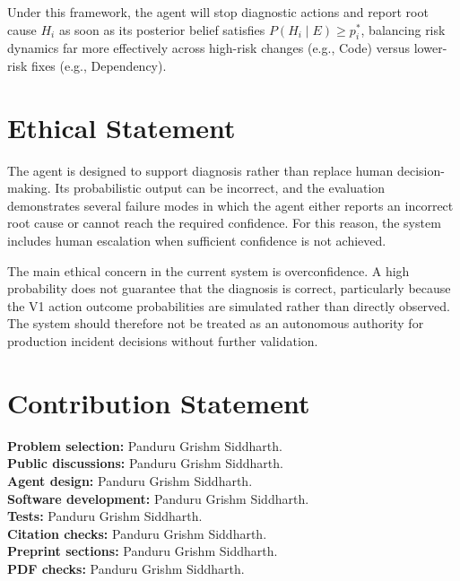 \documentclass{article}
\begin{document}
Under this framework, the agent will stop diagnostic actions and report root cause $H_i$ as soon as its posterior belief satisfies $P(H_i \mid E) \geq p^*_i$, balancing risk dynamics far more effectively across high-risk changes (e.g., Code) versus lower-risk fixes (e.g., Dependency).

\section*{Ethical Statement}

The agent is designed to support diagnosis rather than replace human decision-making. Its probabilistic output can be incorrect, and the evaluation demonstrates several failure modes in which the agent either reports an incorrect root cause or cannot reach the required confidence. For this reason, the system includes human escalation when sufficient confidence is not achieved.

The main ethical concern in the current system is overconfidence. A high probability does not guarantee that the diagnosis is correct, particularly because the V1 action outcome probabilities are simulated rather than directly observed. The system should therefore not be treated as an autonomous authority for production incident decisions without further validation.

\section*{Contribution Statement}

\textbf{Problem selection:} Panduru Grishm Siddharth.\\
\textbf{Public discussions:} Panduru Grishm Siddharth.\\
\textbf{Agent design:} Panduru Grishm Siddharth.\\
\textbf{Software development:} Panduru Grishm Siddharth.\\
\textbf{Tests:} Panduru Grishm Siddharth.\\
\textbf{Citation checks:} Panduru Grishm Siddharth.\\
\textbf{Preprint sections:} Panduru Grishm Siddharth.\\
\textbf{PDF checks:} Panduru Grishm Siddharth.
\end{document}
